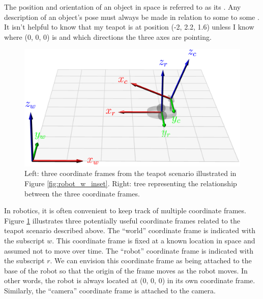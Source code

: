 
The position and orientation of an object in space is referred to as
its .  Any description of an object's pose
must always be made in relation to some to some .  It isn't helpful to know that my teapot is at position (-2,
2.2, 1.6) unless I know where (0, 0, 0) is and which directions the
three axes are pointing.

\begin{figure}
  \includegraphics[]{frames/figs/frames.png}
  \hspace{.5in}

\caption{Left: three coordinate frames from the teapot scenario
  illustrated in Figure \ref{fig:robot_w_inset}.  Right: tree
  representing the relationship between the three coordinate frames.}

\label{fig:frames}
\end{figure}

In robotics, it is often convenient to keep track of multiple
coordinate frames. Figure \ref{fig:frames}  illustrates three potentially useful
coordinate frames related to the teapot scenario described above.  The
``world'' coordinate frame is indicated with the subscript $w$.  This
coordinate frame is fixed at a known location in space and assumed not
to move over time.  The ``robot'' coordinate frame is indicated with
the subscript $r$.  We can envision this coordinate frame as being
attached to the base of the robot so that the origin of the frame
moves as the robot moves.  In other words, the robot is always located
at (0, 0, 0) in its own coordinate frame.  Similarly, the ``camera''
coordinate frame is attached to the camera.

